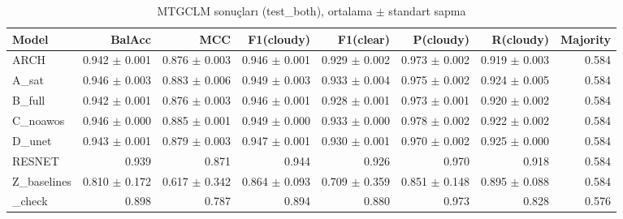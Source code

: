 \begin{table}[ht]
\centering
\caption{MTGCLM sonuçları (test_both), ortalama $\pm$ standart sapma}
\label{tab:results_test_both}
\begin{tabular}{lrrrrrrr}
\hline
Model & BalAcc & MCC & F1(cloudy) & F1(clear) & P(cloudy) & R(cloudy) & Majority \\
\hline
ARCH & 0.942 $\pm$ 0.001 & 0.876 $\pm$ 0.003 & 0.946 $\pm$ 0.001 & 0.929 $\pm$ 0.002 & 0.973 $\pm$ 0.002 & 0.919 $\pm$ 0.003 & 0.584 \\
A\_sat & 0.946 $\pm$ 0.003 & 0.883 $\pm$ 0.006 & 0.949 $\pm$ 0.003 & 0.933 $\pm$ 0.004 & 0.975 $\pm$ 0.002 & 0.924 $\pm$ 0.005 & 0.584 \\
B\_full & 0.942 $\pm$ 0.001 & 0.876 $\pm$ 0.003 & 0.946 $\pm$ 0.001 & 0.928 $\pm$ 0.001 & 0.973 $\pm$ 0.001 & 0.920 $\pm$ 0.002 & 0.584 \\
C\_noawos & 0.946 $\pm$ 0.000 & 0.885 $\pm$ 0.001 & 0.949 $\pm$ 0.000 & 0.933 $\pm$ 0.000 & 0.978 $\pm$ 0.002 & 0.922 $\pm$ 0.002 & 0.584 \\
D\_unet & 0.943 $\pm$ 0.001 & 0.879 $\pm$ 0.003 & 0.947 $\pm$ 0.001 & 0.930 $\pm$ 0.001 & 0.970 $\pm$ 0.002 & 0.925 $\pm$ 0.000 & 0.584 \\
RESNET & 0.939 & 0.871 & 0.944 & 0.926 & 0.970 & 0.918 & 0.584 \\
Z\_baselines & 0.810 $\pm$ 0.172 & 0.617 $\pm$ 0.342 & 0.864 $\pm$ 0.093 & 0.709 $\pm$ 0.359 & 0.851 $\pm$ 0.148 & 0.895 $\pm$ 0.088 & 0.584 \\
\_check & 0.898 & 0.787 & 0.894 & 0.880 & 0.973 & 0.828 & 0.576 \\
\hline
\end{tabular}
\end{table}

